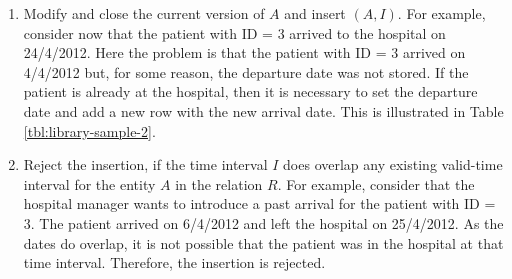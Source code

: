\begin{enumerate}
\begin{enumerate}
	\item Modify and close the current version of $A$ and insert $\left(A, I\right)$. For example, consider now that the patient with ID = 3 arrived to the hospital on 24/4/2012. Here the problem is that the patient with ID = 3 arrived on 4/4/2012 but, for some reason, the departure date was not stored. If the patient is already at the hospital, then it is necessary to set the departure date and add a new row with the new arrival date. This is illustrated in Table \ref{tbl:library-sample-2}.
	\item Reject the insertion, if the time interval $I$ does overlap any existing valid-time interval for the entity $A$ in the relation $R$. For example, consider that the hospital manager wants to introduce a past arrival for the patient with ID = 3. The patient arrived on 6/4/2012 and left the hospital on 25/4/2012. As the dates do overlap, it is not possible that the patient was in the hospital at that time interval. Therefore, the insertion is rejected.
% 


	\end{enumerate}

\end{enumerate}

